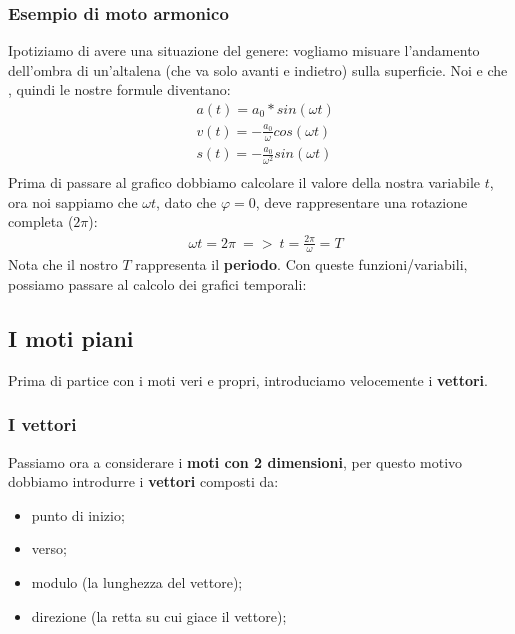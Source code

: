 			\subsubsection{Esempio di moto armonico}
				Ipotiziamo di avere una situazione del genere: vogliamo misuare l'andamento dell'ombra di un'altalena (che va solo avanti e indietro) sulla superficie.
				Noi  e che , quindi le nostre formule diventano:
				\begin{align*}
					&a(t)=a_0 * sin(\omega t)\\
					&v(t)=-\frac{a_0}{\omega} cos(\omega t)\\
					&s(t)=-\frac{a_0}{\omega^2} sin(\omega t)\\
				\end{align*}
				Prima di passare al grafico dobbiamo calcolare il valore della nostra variabile $t$, ora noi sappiamo che $\omega t$, dato che $\varphi = 0$, deve rappresentare una rotazione completa ($2\pi$):
				\begin{align*}
					&\omega t = 2\pi\ =>\ t = \frac{2\pi}{\omega} = T
				\end{align*}
				Nota che il nostro $T$ rappresenta il \textbf{periodo}. Con queste funzioni/variabili, possiamo passare al calcolo dei grafici temporali:

		\subsection{I moti piani}
			Prima di partice con i moti veri e propri, introduciamo velocemente i \textbf{vettori}.

			\subsubsection{I vettori}
				Passiamo ora a considerare i \textbf{moti con 2 dimensioni}, per questo motivo dobbiamo introdurre i \textbf{vettori} composti da:
				\begin{itemize}
					\item punto di inizio;
					\item verso;
					\item modulo (la lunghezza del vettore);
					\item direzione (la retta su cui giace il vettore);
				\end{itemize}

